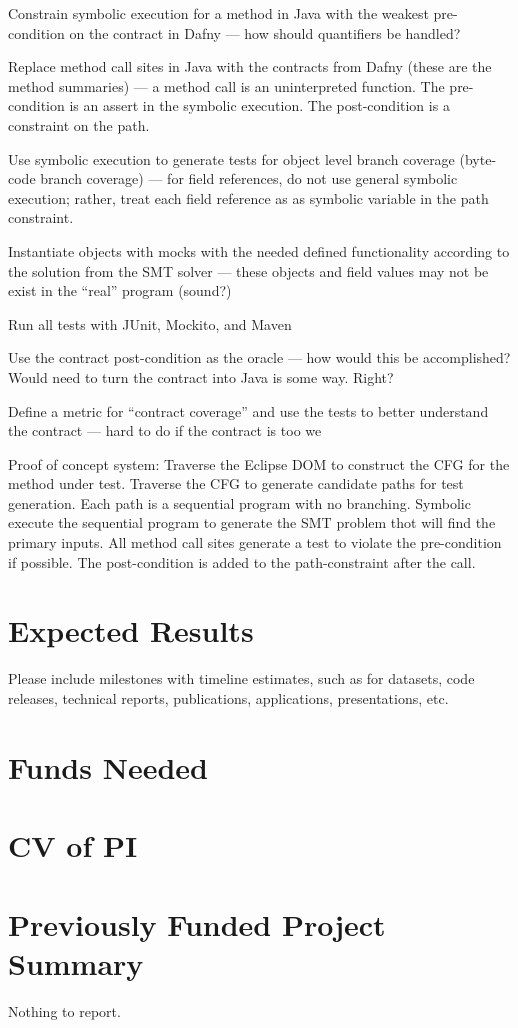 \documentclass[11pt,onecolumn,notitlepage]{article}
\begin{document}
\begin{compactitem}
  \item Constrain symbolic execution for a method in Java with the weakest pre-condition on the contract in Dafny --- how should quantifiers be handled?
  \item Replace method call sites in Java with the contracts from Dafny (these are the method summaries) --- a method call is an uninterpreted function. The pre-condition is an assert in the symbolic execution. The post-condition is a constraint on the path.
  \item Use symbolic execution to generate tests for object level branch coverage (byte-code branch coverage) --- for field references, do not use general symbolic execution; rather, treat each field reference as as symbolic variable in the path constraint. 
  \item Instantiate objects with mocks with the needed defined functionality according to the solution from the SMT solver --- these objects and field values may not be exist in the “real” program (sound?)
  \item Run all tests with JUnit, Mockito, and Maven
  \item Use the contract post-condition as the oracle --- how would this be accomplished? Would need to turn the contract into Java is some way. Right?
  \item Define a metric for “contract coverage” and use the tests to better understand the contract --- hard to do if the contract is too we
\end{compactitem}

Proof of concept system: Traverse the Eclipse DOM to construct the CFG for the method under test. Traverse the CFG to generate candidate paths for test generation. Each path is a sequential program with no branching. Symbolic execute the sequential program to generate the SMT problem thot will find the primary inputs. All method call sites generate a test to violate the pre-condition if possible. The post-condition is added to the path-constraint after the call.

\section*{Expected Results}
Please include milestones with timeline estimates, such as for datasets, code releases, technical reports, publications, applications, presentations, etc. 

\section*{Funds Needed}

\appendix
\appendixpage




\section{CV of PI}

\section{Previously Funded Project Summary}
Nothing to report.
\end{document}
